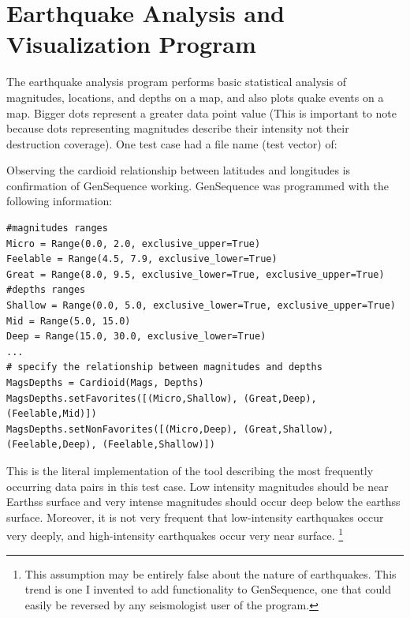 \section{Earthquake Analysis and Visualization Program}
The earthquake analysis program performs basic statistical analysis of magnitudes, locations, and depths on a map, and also plots quake events on a map. Bigger dots represent a greater data point value (This is important to note because dots representing magnitudes describe their intensity not their destruction coverage). One test case had a file name (test vector) of:
\vspace{1cm}

\noindent{}

\vspace{1cm}
Observing the cardioid relationship between latitudes and longitudes is confirmation of GenSequence working. GenSequence was programmed with the following information:
\vspace{1cm}

\begin{lstlisting}
#magnitudes ranges
Micro = Range(0.0, 2.0, exclusive_upper=True)
Feelable = Range(4.5, 7.9, exclusive_lower=True)
Great = Range(8.0, 9.5, exclusive_lower=True, exclusive_upper=True)
#depths ranges
Shallow = Range(0.0, 5.0, exclusive_lower=True, exclusive_upper=True)
Mid = Range(5.0, 15.0)
Deep = Range(15.0, 30.0, exclusive_lower=True)
...
# specify the relationship between magnitudes and depths
MagsDepths = Cardioid(Mags, Depths)
MagsDepths.setFavorites([(Micro,Shallow), (Great,Deep), (Feelable,Mid)])
MagsDepths.setNonFavorites([(Micro,Deep), (Great,Shallow), (Feelable,Deep), (Feelable,Shallow)])
\end{lstlisting}

\vspace{1cm}
This is the literal implementation of the tool describing the most frequently occurring data pairs in this test case. Low intensity magnitudes should be near Earthss surface and very intense magnitudes should occur deep below the earthss surface. Moreover, it is not very frequent that low-intensity earthquakes occur very deeply, and high-intensity earthquakes occur very near surface. \footnote{This assumption may be entirely false about the nature of earthquakes. This trend is one I invented to add functionality to GenSequence, one that could easily be reversed by any seismologist user of the program.}

